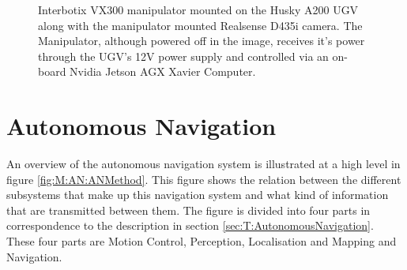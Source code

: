 \begin{figure}[H]
\begin{minipage}[b]{0.49\textwidth}
  \end{minipage}
  \caption{Interbotix VX300 manipulator mounted on the Husky A200 UGV along with the manipulator mounted Realsense D435i camera. The Manipulator, although powered off in the image, receives it's power through the UGV's 12V power supply and controlled via an on-board Nvidia Jetson AGX Xavier Computer.}
  \label{fig:M:H:M:M:MMC:Vx300Complete}
\end{figure}




\section{Autonomous Navigation} \label{sec:M:AutonomousNavigation}
An overview of the autonomous navigation system is illustrated at a high level in figure \ref{fig:M:AN:ANMethod}. This figure shows the relation between the different subsystems that make up this navigation system and what kind of information that are transmitted between them. The figure is divided into four parts in correspondence to the description in section \ref{sec:T:AutonomousNavigation}. These four parts are Motion Control, Perception, Localisation and Mapping and Navigation. 

